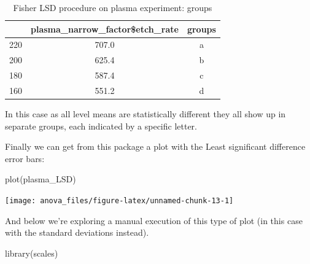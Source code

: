 \documentclass[
]{book}
\newenvironment{Shaded}{\begin{snugshade}}{\end{snugshade}}
\newcommand{\FunctionTok}[1]{\textcolor[rgb]{0.00,0.00,0.00}{#1}}
\newcommand{\NormalTok}[1]{#1}
\begin{document}
\begin{table}

\caption{\label{tab:tab-plasmafishergroups}Fisher LSD procedure on plasma experiment: groups}
\centering
\begin{tabular}[t]{lcc}
\toprule
  & plasma\_narrow\_factor\$etch\_rate & groups\\
\midrule
220 & 707.0 & a\\
200 & 625.4 & b\\
180 & 587.4 & c\\
160 & 551.2 & d\\
\bottomrule
\end{tabular}
\end{table}

In this case as all level means are statistically different they all show up in separate groups, each indicated by a specific letter.

Finally we can get from this package a plot with the Least significant difference error bars:

\begin{Shaded}
\begin{Highlighting}[]
\FunctionTok{plot}\NormalTok{(plasma\_LSD)}
\end{Highlighting}
\end{Shaded}

\texttt{[image: anova\_files/figure-latex/unnamed-chunk-13-1]}

And below we're exploring a manual execution of this type of plot (in this case with the standard deviations instead).

\begin{Shaded}
\begin{Highlighting}[]
\FunctionTok{library}\NormalTok{(scales)}
\end{Highlighting}
\end{Shaded}
\end{document}
